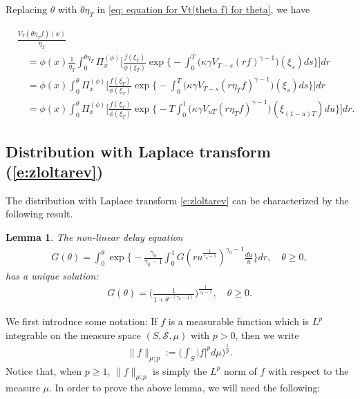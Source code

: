 \documentclass[UTF8]{pkuthss}
\theoremstyle{plain}
\newtheorem{lem}[thm]{Lemma}
\theoremstyle{definition}
\numberwithin{equation}{section}
\begin{document}
	Replacing $\theta$ with $\theta \eta_T$ in \eqref{eq: equation for Vt(theta f) for theta}, we have

\begin{align}\label{eq: equation for normalized V_T}
	&\frac{V_T(\theta \eta_T f)(x)}{\eta_T}
	\\&\quad= \phi(x) \frac{1}{\eta_T}\int_0^{\theta \eta_T} \Pi_x^{(\phi)} \Big[ \frac { f(\xi_T) } { \phi(\xi_T) } \exp\Big\{-\int_0^T \big(\kappa\gamma V_{T-s}(r f)^{\gamma-1}\big)(\xi_s) ds\Big\}\Big] dr
	\\&\quad = \phi(x) \int_0^{\theta} \Pi_x^{(\phi)} \Big[ \frac { f(\xi_T) } { \phi(\xi_T) }  \exp\Big\{-\int_0^T \big(\kappa\gamma V_{T-s}(r \eta_T f)^{\gamma-1}\big)(\xi_s) ds\Big\}\Big] dr
	\\&\quad = \phi(x)\int_0^{\theta} \Pi_x^{(\phi)} \Big[\frac{f(\xi_T)}{\phi(\xi_T)} \exp\Big\{-T\int_0^1 \big(\kappa\gamma V_{uT}(r \eta_T f)^{\gamma-1}\big)(\xi_{(1-u)T}) du\Big\}\Big] dr.
\end{align}

\subsection{Distribution with Laplace transform (\ref{e:zloltarev})}
\label{sec: Characterizing the Zolotarev's distribution using an non-linear delay equation}

The distribution with Laplace transform \eqref{e:zloltarev} can be characterized by the
following result.

\begin{lem} \label{lem: characterize the general Mittag-Leffler distribution}
	The non-linear delay equation
\begin{align} \label{eq: equation for the distribution}
	G( \theta)
	= \int_0^\theta \exp\Big\{ - \frac{\gamma_0} {\gamma_0 - 1} \int_0^1 G(ru^{\frac{1}{\gamma_0 - 1} })^{\gamma_0 - 1}\frac{du}{u} \Big\} dr,
	\quad \theta \geq 0,
\end{align}
	has a unique solution:
\begin{align}\label{eq: solution for the equation}
	G(\theta)
	= \Big(\frac{1}{1+\theta^{-(\gamma_0 - 1)}}\Big)^{\frac{1}{\gamma_0 - 1}},
	\quad \theta \geq 0.
\end{align}
\end{lem}

	We first introduce some notation:
	If $f$ is a measurable function which is $L^p$ integrable on the measure space $(S,\mathscr S,\mu)$ with $p > 0$, then we write
\begin{align}
	\|f\|_{\mu;p}
	:= \Big(\int_{S} |f|^p d\mu \Big)^{\frac{1}{p}}.
\end{align}
	Notice that, when $p\geq 1$, $\|f\|_{\mu;p}$ is simply the $L^p$ norm of $f$ with respect to the measure $\mu$.	
	In order to prove the above lemma, we will need the following:
\end{document}
